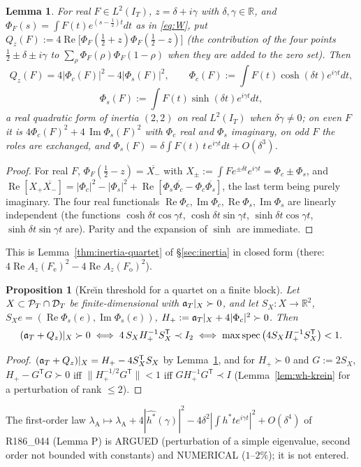 \documentclass[11pt]{amsart}
\newtheorem{proposition}[theorem]{Proposition}
\newtheorem{lemma}[theorem]{Lemma}
\theoremstyle{definition}
\theoremstyle{remark}
\newcommand{\R}{\mathbb R}
\newcommand{\Rel}{\operatorname{Re}}
\newcommand{\Iml}{\operatorname{Im}}
\newcommand{\PT}{\mathcal P_T}
\newcommand{\IT}{I_T}
\begin{document}
\begin{lemma}\label{lem:wh-Q}
For real $F\in L^2(\IT)$, $z=\delta+i\gamma$ with $\delta,\gamma\in\R$, and $\Phi_F(s)=\int F(t)e^{(s-\frac12)t}dt$ as in
\eqref{eq:W}, put $Q_z(F):=4\Rel\big[\Phi_F(\tfrac12+z)\Phi_F(\tfrac12-z)\big]$ (the contribution of the four points
$\frac12\pm\delta\pm i\gamma$ to $\sum_\rho\Phi_F(\rho)\Phi_F(1-\rho)$ when they are added to the zero set). Then
\[
Q_z(F)=4|\Phi_c(F)|^2-4|\Phi_s(F)|^2,\qquad \Phi_c(F):=\int F(t)\cosh(\delta t)e^{i\gamma t}dt,
\]
\[
\Phi_s(F):=\int F(t)\sinh(\delta t)e^{i\gamma t}dt ,
\]
a real quadratic form of inertia $(2,2)$ on real $L^2(\IT)$ when $\delta\gamma\ne0$; on even $F$ it is $4\Phi_c(F)^2+4\,\Iml\Phi_s(F)^2$
with $\Phi_c$ real and $\Phi_s$ imaginary, on odd $F$ the roles are exchanged, and $\Phi_s(F)=\delta\int F(t)\,t\,e^{i\gamma t}dt+O(\delta^3)$.
\end{lemma}
\begin{proof}
For real $F$, $\Phi_F(\frac12-z)=\overline{X_-}$ with $X_\pm:=\int Fe^{\pm\delta t}e^{i\gamma t}=\Phi_c\pm\Phi_s$, and
$\Rel[X_+\overline{X_-}]=|\Phi_c|^2-|\Phi_s|^2+\Rel[\Phi_s\overline{\Phi_c}-\Phi_c\overline{\Phi_s}]$, the last term being purely imaginary.
The four real functionals $\Rel\Phi_c,\Iml\Phi_c,\Rel\Phi_s,\Iml\Phi_s$ are linearly independent (the functions
$\cosh\delta t\cos\gamma t$, $\cosh\delta t\sin\gamma t$, $\sinh\delta t\cos\gamma t$, $\sinh\delta t\sin\gamma t$ are). Parity and the
expansion of $\sinh$ are immediate.
\end{proof}
This is Lemma~\ref{thm:inertia-quartet} of \S\ref{sec:inertia} in closed form (there: $4\Rel A_z(F_{\mathrm e})^2-4\Rel A_z(F_{\mathrm o})^2$).

\begin{proposition}[Kre\u{\i}n threshold for a quartet on a finite block]\label{prop:wh-K}
Let $X\subset\PT\cap\DT$ be finite-dimensional with $\mathfrak a_T|_X\succ0$, and let $S_X:X\to\R^2$, $S_Xe=(\Rel\Phi_s(e),\Iml\Phi_s(e))$,
$H_+:=\mathfrak a_T|_X+4|\Phi_c|^2\succ0$. Then
\[
(\mathfrak a_T+Q_z)|_X\succ0\iff 4\,S_XH_+^{-1}S_X^{\mathsf T}\prec I_2\iff \max\operatorname{spec}\big(4S_XH_+^{-1}S_X^{\mathsf T}\big)<1 .
\]
\end{proposition}
\begin{proof}
$(\mathfrak a_T+Q_z)|_X=H_+-4S_X^{\mathsf T}S_X$ by Lemma~\ref{lem:wh-Q}, and for $H_+\succ0$ and $G:=2S_X$, $H_+-G^{\mathsf T}G\succ0$ iff
$\|H_+^{-1/2}G^{\mathsf T}\|<1$ iff $GH_+^{-1}G^{\mathsf T}\prec I$ (Lemma~\ref{lem:wh-krein} for a perturbation of rank $\le2$).
\end{proof}
The first-order law $\lambda_{\mathrm A}\mapsto\lambda_{\mathrm A}+4|\widehat{h^*}(\gamma)|^2-4\delta^2|\int h^*te^{i\gamma t}|^2+O(\delta^4)$
of R186\_044 (Lemma P) is ARGUED (perturbation of a simple eigenvalue, second order not bounded with constants) and
NUMERICAL ($1$--$2\%$); it is not entered.
\end{document}
